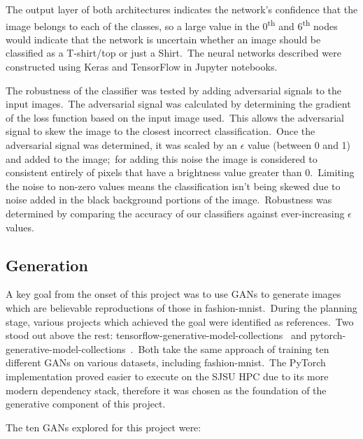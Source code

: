 \documentclass[conference]{IEEEtran}
\begin{document}
    The output layer of both architectures indicates the network's confidence that the image belongs to each of the classes, so a large value in the 0\textsuperscript{th} and 6\textsuperscript{th} nodes would indicate that the network is uncertain whether an image should be classified as a T-shirt/top or just a Shirt.\ The neural networks described were constructed using Keras and TensorFlow in Jupyter notebooks.

    The robustness of the classifier was tested by adding adversarial signals to the input images.\ The adversarial signal was calculated by determining the gradient of the loss function based on the input image used.\ This allows the adversarial signal to skew the image to the closest incorrect classification.\ Once the adversarial signal was determined, it was scaled by an \(\epsilon\) value (between 0 and 1) and added to the image;\ for adding this noise the image is considered to consistent entirely of pixels that have a brightness value greater than 0.\ Limiting the noise to non-zero values means the classification isn't being skewed due to noise added in the black background portions of the image.\ Robustness was determined by comparing the accuracy of our classifiers against ever-increasing \(\epsilon\) values.

    \subsection{Generation}\label{subsec:implementation-generation}

    A key goal from the onset of this project was to use GANs to generate images which are believable reproductions of those in fashion-mnist.\ During the planning stage, various projects which achieved the goal were identified as references.\ Two stood out above the rest: tensorflow-generative-model-collections~\cite{tensorflow-generative-model-collections} and pytorch-generative-model-collections~\cite{original-pytorch-generative-model-collections}.\ Both take the same approach of training ten different GANs on various datasets, including fashion-mnist.\ The PyTorch implementation proved easier to execute on the SJSU HPC due to its more modern dependency stack, therefore it was chosen as the foundation of the generative component of this project.

    The ten GANs explored for this project were:
\end{document}
